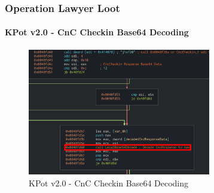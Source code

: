 \documentclass[aspectratio=169]{beamer}
\begin{document}
{
\begin{frame}
  \frametitle{Operation Lawyer Loot}
  \framesubtitle{KPot v2.0 - CnC Checkin Base64 Decoding}
  \begin{figure}
    \includegraphics[width=8cm]{kpot-cnc-checkin-decoding}
    \caption{KPot v2.0 - CnC Checkin Base64 Decoding}
  \end{figure}
\end{frame}
}
\end{document}
